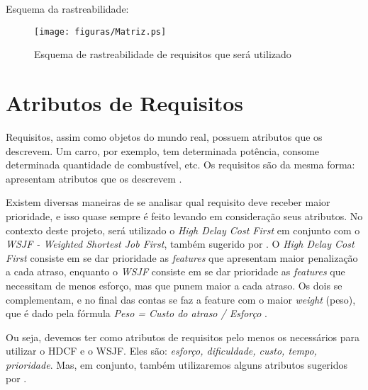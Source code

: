 \newpage
Esquema da rastreabilidade:

\begin{figure}[h]
  \centering
  \caption{Esquema de rastreabilidade de requisitos que será utilizado}
  \texttt{[image: figuras/Matriz.ps]}
\end{figure}

\section{Atributos de Requisitos}
Requisitos, assim como objetos do mundo real, possuem atributos que os descrevem. Um carro, por exemplo, tem determinada potência, consome determinada quantidade de combustível, etc. Os requisitos são da mesma forma: apresentam atributos que os descrevem \cite{tel006}.

Existem diversas maneiras de se analisar qual requisito deve receber maior prioridade, e isso quase sempre é feito levando em consideração seus atributos. No contexto deste projeto, será utilizado o \emph{High Delay Cost First} em conjunto com o \emph{WSJF - Weighted Shortest Job First}, também sugerido por \cite{safe001}. O \emph{High Delay Cost First} consiste em se dar prioridade as \emph{features} que apresentam maior penalização a cada atraso, enquanto o \emph{WSJF} consiste em se dar prioridade as \emph{features} que necessitam de menos esforço, mas que punem maior a cada atraso. Os dois se complementam, e no final das contas se faz a feature com o maior \emph{weight} (peso), que é dado pela fórmula \emph{Peso = Custo do atraso / Esforço} \cite[p. 266]{safe001}.

Ou seja, devemos ter como atributos de requisitos pelo menos os necessários para utilizar o HDCF e o WSJF. Eles são: \emph{esforço, dificuldade, custo, tempo, prioridade}. Mas, em conjunto, também utilizaremos alguns atributos sugeridos por \cite{tel006}.

